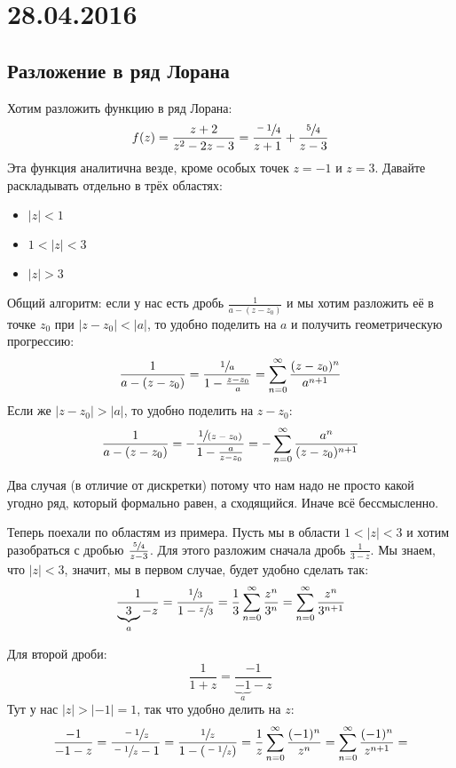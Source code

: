 \chapter{28.04.2016}

\section{Разложение в ряд Лорана}
	Хотим разложить функцию в ряд Лорана:
	\[
		f(z) = \frac{z+2}{z^2-2z-3} = \frac{\sfrac{-1}4}{z+1} + \frac{\sfrac 54}{z-3}
	\]
	Эта функция аналитична везде, кроме особых точек $z=-1$ и $z=3$.
	Давайте раскладывать отдельно в трёх областях:
	\begin{itemize}
		\item $|z| < 1$
		\item $1 < |z| < 3$
		\item $|z| > 3$
	\end{itemize}

	Общий алгоритм: если у нас есть дробь $\frac{1}{a-(z-z_0)}$ и мы хотим разложить её в точке $z_0$
	при $|z-z_0|<|a|$, то удобно поделить на $a$ и получить геометрическую прогрессию:
	\[
		\frac{1}{a-(z-z_0)} = \frac{\sfrac 1a}{1-\frac{z-z_0}{a}} = \sum_{n=0}^{\infty} \frac{(z-z_0)^n}{a^{n+1}}
	\]
	Если же $|z-z_0|>|a|$, то удобно поделить на $z-z_0$:
	\[
		\frac{1}{a-(z-z_0)} = - \frac{\sfrac 1{(z-z_0)}}{1-\frac{a}{z-z_0}} =
		- \sum_{n=0}^\infty \frac{a^n}{(z-z_0)^{n+1}}
	\]
	\begin{Rem}
		Два случая (в отличие от дискретки) потому что нам надо не просто какой угодно ряд, который
		формально равен, а сходящийся.
		Иначе всё бессмысленно.
	\end{Rem}

	Теперь поехали по областям из примера.
	Пусть мы в области $1<|z|<3$ и хотим разобраться с дробью $\frac{\sfrac 54}{z-3}$.
	Для этого разложим сначала дробь $\frac{1}{3-z}$.
	Мы знаем, что $|z|<3$, значит, мы в первом случае, будет удобно сделать так:
	\[
		\frac{1}{\underbrace{3}_{a}-z} = \frac{\sfrac 13}{1-\sfrac z3} = \frac13 \sum_{n=0}^\infty \frac{z^n}{3^n} =
		\sum_{n=0}^\infty \frac{z^n}{3^{n+1}}
	\]

	Для второй дроби:
	\[
		\frac{1}{1+z} = \frac{-1}{\underbrace{-1}_{a}-z}
	\]
	Тут у нас $|z|>|-1|=1$, так что удобно делить на $z$:
	\[
		\frac{-1}{-1-z} =
		\frac{\sfrac{-1}{z}}{\sfrac{-1}{z}-1} = 
		\frac{\sfrac{1}{z}}{1-(\sfrac{-1}{z})} =
		\frac1z \sum_{n=0}^\infty \frac{(-1)^n}{z^n} =
		\sum_{n=0}^\infty \frac{(-1)^n}{z^{n+1}} =
	\]

